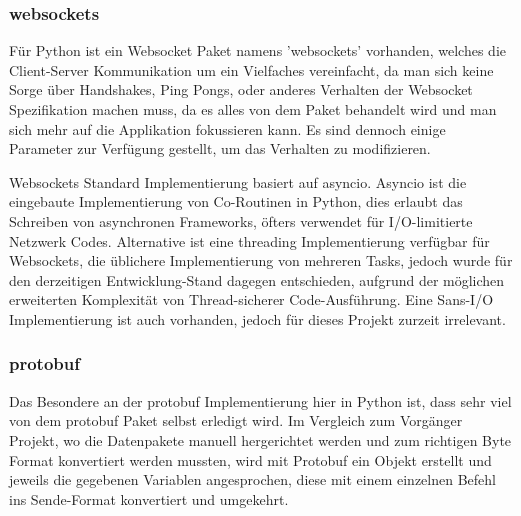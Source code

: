 \subsubsection{websockets}
Für Python ist ein Websocket Paket namens 'websockets' vorhanden, 
welches die Client-Server Kommunikation um ein Vielfaches vereinfacht, 
da man sich keine Sorge über Handshakes, Ping Pongs, 
oder anderes Verhalten der Websocket Spezifikation machen muss, 
da es alles von dem Paket behandelt wird 
und man sich mehr auf die Applikation fokussieren kann. 
Es sind dennoch einige Parameter zur Verfügung gestellt, 
um das Verhalten zu modifizieren.

Websockets Standard Implementierung basiert auf asyncio.
%  
Asyncio ist die eingebaute Implementierung von Co-Routinen in Python,
dies erlaubt das Schreiben von asynchronen Frameworks, 
öfters verwendet für I/O-limitierte Netzwerk Codes.
Alternative ist eine threading Implementierung verfügbar für Websockets, 
die üblichere Implementierung von mehreren Tasks, 
jedoch wurde für den derzeitigen Entwicklung-Stand dagegen entschieden,
aufgrund der möglichen erweiterten Komplexität von Thread-sicherer Code-Ausführung.
Eine Sans-I/O Implementierung ist auch vorhanden, 
jedoch für dieses Projekt zurzeit irrelevant.

\subsubsection{protobuf}
Das Besondere an der protobuf Implementierung hier in Python ist,
dass sehr viel von dem protobuf Paket selbst erledigt wird.
Im Vergleich zum Vorgänger Projekt, wo die Datenpakete manuell hergerichtet werden
und zum richtigen Byte Format konvertiert werden mussten, 
wird mit Protobuf ein Objekt erstellt 
und jeweils die gegebenen Variablen angesprochen, 
diese mit einem einzelnen Befehl ins Sende-Format konvertiert und umgekehrt.


